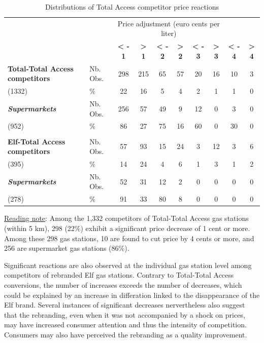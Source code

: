 \documentclass[english]{article}
\begin{document}
\begin{table}[H]
\caption{Distributions of Total Access competitor price reactions}
\label{tab:competitor_price_reactions_stats}
\begin{threeparttable}
\begin{tiny}
\begin{tabular}{llcccccccc}
\hline
\hline
{} & {} & \multicolumn{6}{c}{Price adjustment (euro cents per liter)} \tabularnewline
 &  & \textbf{< - 1}  & \textbf{> 1}  & \textbf{< - 2}  & \textbf{> 2}  & \textbf{< - 3}  & \textbf{> 3}  & \textbf{< - 4}  & \textbf{> 4}\tabularnewline
\hline
\textbf{Total-Total Access competitors}  & Nb. Obs.  & 298  & 215  & 65  & 57  & 20  & 16  & 10  & 3\tabularnewline
(1332)  & \%  & 22  & 16  & 5  & 4  & 2  & 1  & 1  & 0\tabularnewline
\textbf{\textit{Supermarkets}}  & Nb. Obs.  & 256  & 57  & 49  & 9  & 12  & 0  & 3  & 0\tabularnewline
(952)  & \%  & 86  & 27  & 75  & 16  & 60  & 0  & 30  & 0\tabularnewline
 &  &  &  &  &  &  &  &  & \tabularnewline
\hline
\textbf{Elf-Total Access competitors}  & Nb. Obs.  & 57  & 93  & 15  & 24  & 3  & 12  & 3  & 6\tabularnewline
(395)  & \%  & 14  & 24  & 4  & 6  & 1  & 3  & 1  & 2\tabularnewline
\textbf{\textit{Supermarkets}}  & Nb. Obs.  & 52  & 31  & 12  & 2  & 0  & 0  & 0  & 0\tabularnewline
(278)  & \%  & 91  & 33  & 80  & 8  & 0  & 0  & 0  & 0\tabularnewline
\hline
\hline
\end{tabular}
\end{tiny}
\end{threeparttable}
\end{table}

{\small{}\uline{Reading note}}{\small{}:} Among the 1,332 competitors of Total-Total Access gas stations (within 5 km), 298 (22\%) exhibit a significant price decrease of 1 cent or more. Among these 298 gas stations, 10 are found to cut price by 4 cents or more, and 256 are supermarket gas stations (86\%).\medskip{}

Significant reactions are also observed at the individual gas station level among competitors of rebranded Elf gas stations. Contrary to Total-Total Access conversions, the number of increases exceeds the number of decreases, which could be explained by an increase in differation linked to the disappearance of the Elf brand. Several instances of significant decreases nervertheless also suggest that the rebranding, even when it was not accompanied by a shock on prices, may have increased consumer attention and thus the intensity of competition. Consumers may also have perceived the rebranding as a quality improvement.\medskip{}
\end{document}
